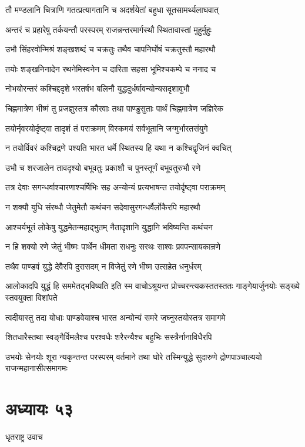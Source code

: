 \twolineshloka
{तौ मण्डलानि चित्राणि गतत्प्रत्यागतानि च}
{अदर्शयेतां बहुधा सूतसामर्थ्यलाघवात्}


\twolineshloka
{अन्तरं च प्रहारेषु तर्कयन्तौ परस्परम्}
{राजन्नन्तरमार्गस्थौ स्थितावास्तां मुहुर्मुहुः}


\twolineshloka
{उभौ सिंहरवोन्मिश्रं शङ्खशब्दं च चक्रतुः}
{तथैव चापनिर्घोषं चक्रतुस्तौ महारथौ}


\twolineshloka
{तयोः शङ्खनिनादेन रथनेमिस्वनेन च}
{दारिता सहसा भूमिश्चकम्पे च ननाद च}


\twolineshloka
{नोभयोरन्तरं कश्चिद्ददृशे भरतर्षभ}
{बलिनौ युद्धदुर्धर्षावन्योन्यसदृशावुभौ}


\twolineshloka
{चिह्नमात्रेण भीष्मं तु प्रजज्ञुस्तत्र कौरवाः}
{तथा पाण्डुसुताः पार्थं चिह्नमात्रेण जज्ञिरेक}


\twolineshloka
{तयोर्नृवरयोर्दृष्ट्वा तादृशं तं पराक्रमम्}
{विस्कमयं सर्वभूतानि जग्मुर्भारतसंयुगे}


\twolineshloka
{न तयोर्विवरं कश्चिद्रणे पश्यति भारत}
{धर्मे स्थितस्य हि यथा न कश्चिद्वृजिनं क्वचित्}


\twolineshloka
{उभौ च शरजालेन तावदृश्यो बभूवतुः}
{प्रकाशौ च पुनस्तूर्णं बभूवतुरुभौ रणे}


\twolineshloka
{तत्र देवाः सगन्धर्वाश्चारणाश्चर्षिभिः सह}
{अन्योन्यं प्रत्यभाषन्त तयोर्दृष्ट्वा पराक्रमम्}


\twolineshloka
{न शक्यौ युधि संरब्धौ जेतुमेतौ कथंचन}
{सदेवासुरगन्धर्वैर्लोकैरपि महारथौ}


\twolineshloka
{आश्चर्यभूतं लोकेषु युद्धमेतन्महाद्भुतम्}
{नैतादृशानि युद्धानि भविष्यन्ति कथंचन}


\twolineshloka
{न हि शक्यो रणे जेतुं भीष्मः पार्थेन धीमता}
{सधनुः सरथः साश्वः प्रवपन्सायकान्रणे}


\twolineshloka
{तथैव पाण्डवं युद्धे देवैरपि दुरासदम्}
{न विजेतुं रणे भीष्म उत्सहेत धनुर्धरम्}


\threelineshloka
{आलोकादपि युद्धं हि सममेतद्भविष्यति}
{इति स्म वाचोऽश्रूयन्त प्रोच्चरन्त्यकस्ततस्ततः}
{गाङ्गेयार्जुनयोः सङ्ख्ये स्तवयुक्ता विशांपते}


\twolineshloka
{त्वदीयास्तु तदा योधाः पाण्डवेयाश्च भारत}
{अन्योन्यं समरे जघ्नुस्तयोस्तत्र समागमे}


\twolineshloka
{शितधारैस्तथा स्वङ्गैर्विमलैश्च परश्वधैः}
{शरैरन्यैश्च बहुभिः सस्त्रैर्नानाविधैरपि}


\threelineshloka
{उभयोः सेनयोः शूरा न्यकृन्तन्त परस्परम्}
{वर्तमाने तथा घोरे तस्मिन्युद्धे सुदारुणे}
{द्रोणपाञ्चाल्ययो राजन्महानासीत्समागमः}


\chapter{अध्यायः ५३}
\twolineshloka
{धृतराष्ट्र उवाच}
{}


